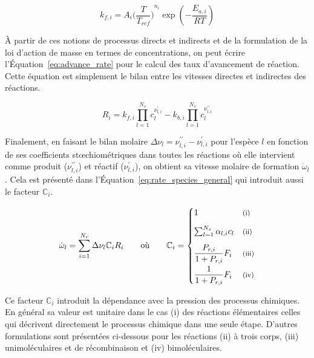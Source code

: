 \begin{equation}
  k_{f,i}=
  A_{i}{\biggr(\frac{T}{T_{ref}}\biggr)}^{n_{i}}\exp\left(-\frac{E_{a,i}}{RT}\right)
  \label{eq:reaction_constant}
\end{equation}

À partir de ces notions de processus directs et indirects et de la formulation de la loi d'action de masse en termes de concentrations, on peut écrire l'Équation~\ref{eq:advance_rate} pour le calcul des taux d'avancement de réaction. Cette équation est simplement le bilan entre les vitesses directes et indirectes des réactions.

\begin{equation}
  R_{i}=
  k_{f,i}\prod_{l=1}^{N_{s}}c_{l}^{\nu_{l,i}^{\prime}}-
  k_{b,i}\prod_{l=1}^{N_{s}}c_{l}^{\nu_{l,i}^{\prime\prime}}
  \label{eq:advance_rate}
\end{equation}

Finalement, en faisant le bilan molaire $\Delta{}\nu_{l}=\nu_{l,i}^{\prime\prime}-\nu_{l,i}^{\prime}$ pour l'espèce $l$ en fonction de ses coefficients st{\oe}chiométriques dans toutes les réactions où elle intervient comme produit ($\nu_{l,i}^{\prime\prime}$) et réactif ($\nu_{l,i}^{\prime}$), on obtient sa vitesse molaire de formation $\dot{\omega}_{l}$.  Cela est présenté dans l'Équation~\ref{eq:rate_species_general} qui introduit aussi le facteur $\mathbb{C}_{i}$. 

\begin{equation}
  \dot{\omega}_{l}=
  \sum_{i=1}^{N_{r}}\Delta{}\nu_{l}
  \mathbb{C}_{i}R_{i}
  \qquad\text{où}\qquad
  \mathbb{C}_{i}=
  \begin{cases}
    1 
    & \text{\footnotesize{}(i)}\\[8pt]
    \sum_{l=1}^{N_{s}}\alpha_{l,i}c_{l} 
    & \text{\footnotesize{}(ii)}\\[8pt]
    \dfrac{P_{r,i}}{1+P_{r,i}}F_{i} 
    & \text{\footnotesize{}(iii)}\\[8pt]
    \dfrac{1}{1+P_{r,i}}F_{i} 
    & \text{\footnotesize{}(iv)}
  \end{cases}
 \label{eq:rate_species_general}
\end{equation}

\clearpage

Ce facteur $\mathbb{C}_{i}$  introduit la dépendance avec la pression des processus chimiques. En général sa valeur est unitaire dans le cas (i) des réactions élémentaires \textemdash{} celles qui décrivent directement le processus chimique dans une seule étape. D'autres formulations sont présentées ci-dessous pour les réactions (ii) à trois corps, (iii) unimoléculaires et de récombinaison et (iv) bimoléculaires. %

